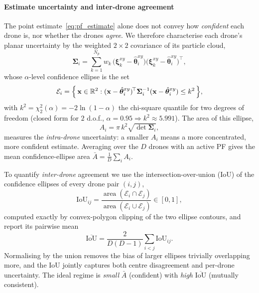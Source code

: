 \documentclass[journal,10pt,twocolumn]{IEEEtran}
\begin{document}
\paragraph{Estimate uncertainty and inter-drone agreement}
The point estimate~\eqref{eq:pf_estimate} alone does not convey how
\emph{confident} each drone is, nor whether the drones \emph{agree}.
We therefore characterise each drone's planar uncertainty by the
weighted $2\times2$ covariance of its particle cloud,
\begin{equation}
  \bm{\Sigma}_i = \sum_{k=1}^{N_p} w_k\,
  \bigl(\bm{\xi}_k^{xy} - \hat{\bm{\theta}}_i^{xy}\bigr)
  \bigl(\bm{\xi}_k^{xy} - \hat{\bm{\theta}}_i^{xy}\bigr)^{\!\top},
  \label{eq:pf_cov}
\end{equation}
whose $\alpha$-level confidence ellipse is the set
\begin{equation}
  \mathcal{E}_i = \Bigl\{\, \mathbf{x}\in\mathbb{R}^2 :
  (\mathbf{x}-\hat{\bm{\theta}}_i^{xy})^{\!\top}\bm{\Sigma}_i^{-1}
  (\mathbf{x}-\hat{\bm{\theta}}_i^{xy}) \le k^2 \,\Bigr\},
  \label{eq:pf_ellipse}
\end{equation}
with $k^2 = \chi^2_{2}(\alpha) = -2\ln(1-\alpha)$ the chi-square quantile
for two degrees of freedom (closed form for $2$ d.o.f.,
$\alpha = 0.95 \Rightarrow k^2 \approx 5.991$).  The area of this ellipse,
\begin{equation}
  A_i = \pi\,k^2\sqrt{\det \bm{\Sigma}_i},
  \label{eq:pf_area}
\end{equation}
measures the \emph{intra-drone} uncertainty: a smaller $A_i$ means a more
concentrated, more confident estimate.  Averaging over the $D$ drones with
an active PF gives the mean confidence-ellipse area $\bar{A} =
\frac{1}{D}\sum_{i} A_i$.

To quantify \emph{inter-drone} agreement we use the
intersection-over-union (IoU) of the confidence ellipses of every drone
pair $(i,j)$,
\begin{equation}
  \mathrm{IoU}_{ij} =
  \frac{\operatorname{area}(\mathcal{E}_i \cap \mathcal{E}_j)}
       {\operatorname{area}(\mathcal{E}_i \cup \mathcal{E}_j)}
  \in [0,1],
  \label{eq:pf_iou}
\end{equation}
computed exactly by convex-polygon clipping of the two ellipse contours,
and report its pairwise mean
\begin{equation}
  \overline{\mathrm{IoU}} = \frac{2}{D(D-1)}
  \sum_{i<j} \mathrm{IoU}_{ij}.
  \label{eq:pf_iou_mean}
\end{equation}
Normalising by the union removes the bias of larger ellipses trivially
overlapping more, and the IoU jointly captures both centre disagreement
and per-drone uncertainty.  The ideal regime is \emph{small} $\bar{A}$
(confident) with \emph{high} $\overline{\mathrm{IoU}}$ (mutually consistent).
\end{document}
